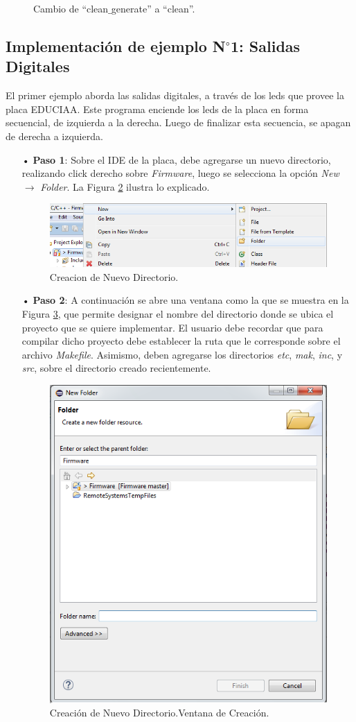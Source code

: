 \documentclass[12pt,letterpaper]{article}
\begin{document}
\begin{enumerate}
\begin{figure}[H]
\caption{Cambio de “clean$\_$generate” a “clean”.}
\label{Fig19}
\end{figure}


\end{enumerate}

\subsection{Implementación de ejemplo N$^{\circ}$1: Salidas Digitales}\label{sec:ej1sapi}
El primer ejemplo aborda las salidas digitales, a través de los leds que provee la placa EDUCIAA. Este programa enciende los leds de la placa en forma secuencial, de izquierda a la derecha. Luego de finalizar esta secuencia, se apagan de derecha a izquierda.
\begin{enumerate}
\item[•]\textbf{Paso 1}: Sobre el IDE de la placa, debe agregarse un nuevo directorio, realizando click derecho sobre \textit{Firmware}, luego se selecciona la opción \textit{New} $\rightarrow$ \textit{Folder}. La Figura \ref{nuevodirectorio} ilustra lo explicado.
\begin{figure}[H]
\centering
\includegraphics[width=8 cm]{figuras/f43.png}
\caption{Creacion de Nuevo Directorio.}
\label{nuevodirectorio}
\end{figure}
\item[•]\textbf{Paso 2}: A continuación se abre una ventana como la que se muestra en la Figura \ref{nuevodirectorio2}, que permite designar el nombre del directorio donde se ubica el proyecto que se quiere implementar. El usuario debe recordar que para compilar dicho proyecto debe establecer la ruta que le corresponde sobre el archivo \textit{Makefile}. Asimismo, deben agregarse los directorios \textit{etc}, \textit{mak}, \textit{inc}, y \textit{src}, sobre el directorio creado recientemente.
\begin{figure}[H]
\centering
\includegraphics[width=8 cm]{figuras/f44.png}
\caption{Creación de Nuevo Directorio.Ventana de Creación.}
\label{nuevodirectorio2}
\end{figure}


\end{enumerate}
\end{document}
